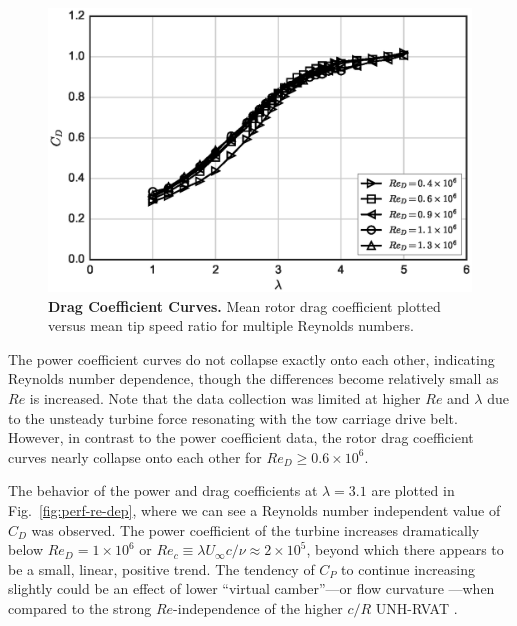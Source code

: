 \documentclass[10pt,letterpaper]{article}
\begin{document}
\begin{figure}[h]
    \includegraphics[width=\textwidth]{figures/cd_curves.eps}

    \caption{{\bf Drag Coefficient Curves.} Mean rotor drag coefficient plotted
    versus mean tip speed ratio for multiple Reynolds numbers.}

    \label{fig:cd-curves}
\end{figure}

The power coefficient curves do not collapse exactly onto each other, indicating
Reynolds number dependence, though the differences become relatively small as
$Re$ is increased. Note that the data collection was limited at higher $Re$ and
$\lambda$ due to the unsteady turbine force resonating with the tow carriage
drive belt. However, in contrast to the power coefficient data, the rotor drag
coefficient curves nearly collapse onto each other for $Re_D \ge 0.6 \times
10^6$.

The behavior of the power and drag coefficients at $\lambda=3.1$ are plotted in
Fig.~\ref{fig:perf-re-dep}, where we can see a Reynolds number independent value
of $C_D$ was observed. The power coefficient of the turbine increases
dramatically below $Re_D = 1 \times 10^6$ or $Re_c \equiv \lambda U_\infty c /
\nu \approx 2 \times 10^5$, beyond which there appears to be a small, linear,
positive trend. The tendency of $C_P$ to continue increasing slightly could be
an effect of lower ``virtual camber''---or flow curvature
\cite{Migliore1980}---when compared to the strong $Re$-independence of the
higher $c/R$ UNH-RVAT \cite{Bachant2016-RVAT-Re-dep}.
\end{document}

